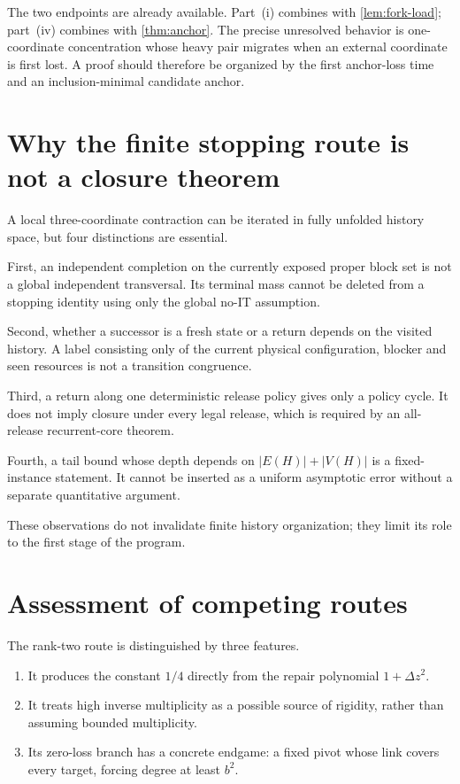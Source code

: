 \documentclass[11pt]{article}
\begin{document}
The two endpoints are already available.  Part~(i) combines with
\cref{lem:fork-load}; part~(iv) combines with \cref{thm:anchor}.  The precise
unresolved behavior is one-coordinate concentration whose heavy pair migrates
when an external coordinate is first lost.  A proof should therefore be
organized by the first anchor-loss time and an inclusion-minimal candidate
anchor.

\section{Why the finite stopping route is not a closure theorem}

A local three-coordinate contraction can be iterated in fully unfolded history
space, but four distinctions are essential.

First, an independent completion on the currently exposed proper block set is
not a global independent transversal.  Its terminal mass cannot be deleted
from a stopping identity using only the global no-IT assumption.

Second, whether a successor is a fresh state or a return depends on the visited
history.  A label consisting only of the current physical configuration,
blocker and seen resources is not a transition congruence.

Third, a return along one deterministic release policy gives only a policy
cycle.  It does not imply closure under every legal release, which is required
by an all-release recurrent-core theorem.

Fourth, a tail bound whose depth depends on
\(|E(H)|+|V(H)|\) is a fixed-instance statement.  It cannot be inserted as a
uniform asymptotic error without a separate quantitative argument.

These observations do not invalidate finite history organization; they limit
its role to the first stage of the program.

\section{Assessment of competing routes}

The rank-two route is distinguished by three features.

\begin{enumerate}[label=(\arabic*)]
\item It produces the constant \(1/4\) directly from the repair polynomial
\(1+\Delta z^2\).
\item It treats high inverse multiplicity as a possible source of rigidity,
rather than assuming bounded multiplicity.
\item Its zero-loss branch has a concrete endgame: a fixed pivot whose link
covers every target, forcing degree at least \(b^2\).
\end{enumerate}
\end{document}
